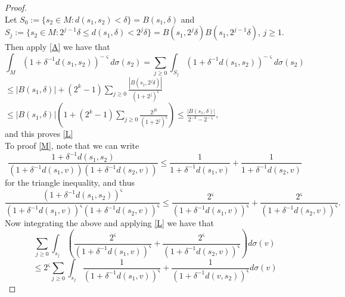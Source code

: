 \documentclass[10pt,a4paper]{amsart}
\begin{document}
	\begin{proof}
		\ \\
		\normalfont
		Let $ S_0 := \{s_2\in M: d(s_1,s_2)< \delta\} = B(s_1,\delta)$ and\\ $S_j := \{s_2\in M : 2^{j-1} \delta \leq d(s_1,\delta)<2^j\delta\} = B(s_1,2^j \delta)  B(s_1,2^{j-1} \delta)$, \hspace{0.2 cm} $j\geq 1$.
		Then apply \eqref{A} we have that
		\begin{equation*}
			\int_M \left(1 + \delta^{-1} d(s_1,s_2) \right)^{-\varsigma}d\sigma(s_2) = \sum_{j\geq 0} \displaystyle \int_{S_j} \left(1 + \delta^{-1} d(s_1,s_2) \right)^{-\varsigma}d\sigma(s_2)
		\end{equation*}
$\leq |B(s_1,\delta)|+ (2^k -1) \sum_{j\geq 0} \frac{|B(s_1, 2^j \delta)|}{(1+2^j)^{\varsigma}}$\\
$\leq |B(s_1,\delta)| \left(1+(2^k -1)\sum_{j\geq 0} \frac{2^{jk}}{(1+2^j)^\varsigma} \right) \leq \frac{|B(s_1, \delta)|}{2^{-k} - 2^{-\varsigma}},$\\
and this proves \eqref{L}\\
		To proof \eqref{M}, note that we can write\\
		\begin{equation*}
			\frac{1+\delta^{-1} d(s_1,s_2)}{(1+\delta^{-1} d(s_1,v))(1+\delta^{-1} d(s_2,v))} \leq \frac{1}{1+\delta^{-1} d(s_1,v)} + \frac{1}{1+\delta^{-1} d(s_2,v)}
		\end{equation*}
		for the triangle inequality, and thus
		\begin{equation}
			\frac{(1+\delta^{-1} d(s_1,s_2))^{\varsigma}}{(1+\delta^{-1} d(s_1,v))^{\varsigma} (1+\delta^{-1} d(s_2,v))^{\varsigma}} \leq \frac{2^{\varsigma}}{(1+\delta^{-1} d(s_1,v))^{\varsigma}} + \frac{2^{\varsigma}}{(1+\delta^{-1} d(s_2,v))^{\varsigma}}.
		\end{equation}
		Now integrating the above and applying \eqref{L} we have that
		\begin{equation*}
			\sum_{j\geq 0}\displaystyle\int_{s_j}\left( \frac{2^{\varsigma}}{(1+\delta^{-1} d(s_1,v))^{\varsigma}} + \frac{2^{\varsigma}}{(1+\delta^{-1} d(s_2,v))^{\varsigma}} \right) d\sigma (v)
		\end{equation*}
		\begin{equation*}
			\leq 2^{\varsigma}\sum_{j\geq 0}\displaystyle\int_{s_j}\frac{1}{(1+\delta^{-1} d(s_1,v))^{\varsigma}}+\frac{1}{(1+\delta^{-1} d(v,s_2))^{\varsigma}} d\sigma (v)
		\end{equation*}
		\begin{equation*}

\end{equation*}
\end{proof}
\end{document}

